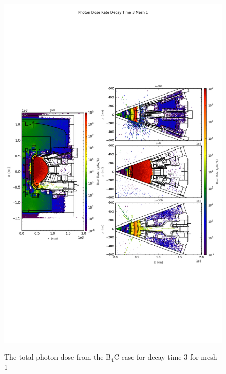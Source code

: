 \begin{figure}[ht!]
\centering
\includegraphics[trim={0cm 9cm 0cm 10cm},clip,scale=0.75]{../plots/final_model_with_b4c/Photon_Dose_Rate_Decay_Time_3_Mesh_1.png}
\label{fig:photons_dc3_no4bc_m1_flux}
\caption{The total photon dose from the B$_4$C case for decay time 3 for mesh 1}
\end{figure}
